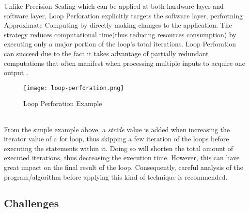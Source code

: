 Unlike Precision Scaling which can be applied at both hardware layer and software layer, Loop Perforation explicitly targets the software layer, performing Approximate Computing by directly making changes to the application. The strategy reduces computational time(thus reducing resources consumption) by executing only a major portion of the loop's total iterations. Loop Perforation can succeed due to the fact it takes advantage of partially redundant computations that often manifest when processing multiple inputs to acquire one output \cite{LoopPerforation}. \\

\begin{figure}[H]
\texttt{[image: loop-perforation.png]}
\centering
\caption{Loop Perforation Example}
\end{figure}
~\\
From the simple example above, a \textit{stride} value is added when increasing the iterator value of a for loop, thus skipping a few iteration of the loops before executing the statements within it. Doing so will shorten the total amount of executed iterations, thus decreasing the execution time. However, this can have great impact on the final result of the loop. Consequently, careful analysis of the program/algorithm before applying this kind of technique is recommended. \\ 

\subsection{Challenges}

